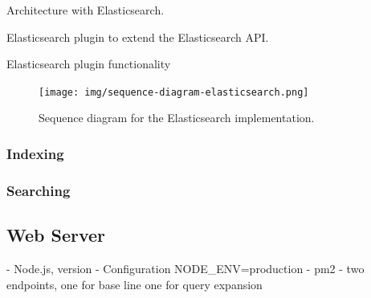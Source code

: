 Architecture with Elasticsearch.

Elasticsearch plugin to extend the Elasticsearch API.

Elasticsearch plugin functionality

\begin{figure}[h!]
\centering \texttt{[image: img/sequence-diagram-elasticsearch.png]}
\caption{Sequence diagram for the Elasticsearch implementation.}
\label{fig:sequence-diagram-lucene}
\end{figure}

\subsubsection{Indexing}
\subsubsection{Searching}


\subsection{Web Server}
- Node.js, version
- Configuration NODE\_ENV=production
- pm2
- two endpoints, one for base line one for query expansion
